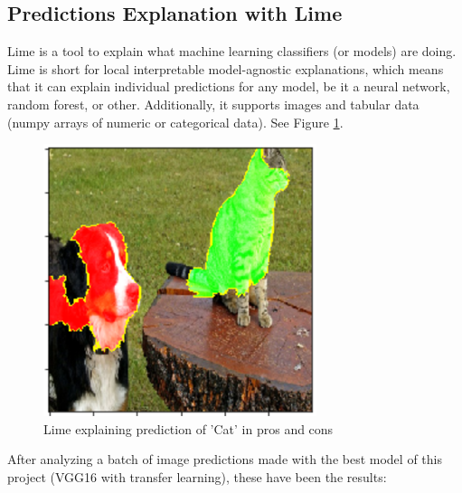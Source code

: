 \documentclass[11pt, a4paper]{article}
\begin{document}
\subsection{Predictions Explanation with Lime}
Lime is a tool to explain what machine learning classifiers (or models) are doing. Lime is short for local interpretable model-agnostic explanations, which means that it can explain individual predictions for any model, be it a neural network, random forest, or other. Additionally, it supports images and tabular data (numpy arrays of numeric or categorical data). See Figure \ref{fig:Lime explaining prediction of 'Cat' in pros and cons}.
\begin{figure}[H]
	\centering
	\includegraphics[width=8cm]{imgs/general/Lime explaining prediction of 'Cat' in pros and cons.png}
	\caption{Lime explaining prediction of 'Cat' in pros and cons}
	 \label{fig:Lime explaining prediction of 'Cat' in pros and cons}
\end{figure}
\noindent  After analyzing a batch of image predictions made with the best model of this project (VGG16 with transfer learning), these have been the results:
\end{document}
